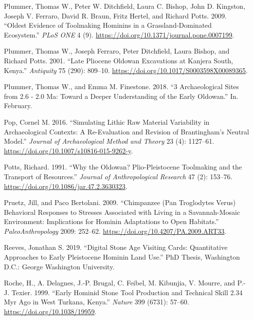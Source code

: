 \documentclass[]{elsarticle} %
\begin{document}
\leavevmode\hypertarget{ref-plummerOldestEvidenceToolmaking2009}{}%
Plummer, Thomas W., Peter W. Ditchfield, Laura C. Bishop, John D.
Kingston, Joseph V. Ferraro, David R. Braun, Fritz Hertel, and Richard
Potts. 2009. ``Oldest Evidence of Toolmaking Hominins in a
Grassland-Dominated Ecosystem.'' \emph{PLoS ONE} 4 (9).
\url{https://doi.org/10.1371/journal.pone.0007199}.

\leavevmode\hypertarget{ref-plummerLatePlioceneOldowan2001}{}%
Plummer, Thomas W., Joseph Ferraro, Peter Ditchfield, Laura Bishop, and
Richard Potts. 2001. ``Late Pliocene Oldowan Excavations at Kanjera
South, Kenya.'' \emph{Antiquity} 75 (290): 809--10.
\url{https://doi.org/10.1017/S0003598X00089365}.

\leavevmode\hypertarget{ref-plummerArchaeologicalSitesMa2018}{}%
Plummer, Thomas W., and Emma M. Finestone. 2018. ``3 Archaeological
Sites from 2.6 - 2.0 Ma: Toward a Deeper Understanding of the Early
Oldowan.'' In. February.

\leavevmode\hypertarget{ref-popSimulatingLithicRaw2016}{}%
Pop, Cornel M. 2016. ``Simulating Lithic Raw Material Variability in
Archaeological Contexts: A Re-Evaluation and Revision of Brantingham's
Neutral Model.'' \emph{Journal of Archaeological Method and Theory} 23
(4): 1127--61. \url{https://doi.org/10.1007/s10816-015-9262-y}.

\leavevmode\hypertarget{ref-pottsWhyOldowanPlioPleistocene1991}{}%
Potts, Richard. 1991. ``Why the Oldowan? Plio-Pleistocene Toolmaking and
the Transport of Resources.'' \emph{Journal of Anthropological Research}
47 (2): 153--76. \url{https://doi.org/10.1086/jar.47.2.3630323}.

\leavevmode\hypertarget{ref-pruetzChimpanzeePanTroglodytes2009}{}%
Pruetz, Jill, and Paco Bertolani. 2009. ``Chimpanzee (Pan Troglodytes
Verus) Behavioral Responses to Stresses Associated with Living in a
Savannah-Mosaic Environment: Implications for Hominin Adaptations to
Open Habitats.'' \emph{PaleoAnthropology} 2009: 252--62.
\url{https://doi.org/10.4207/PA.2009.ART33}.

\leavevmode\hypertarget{ref-reevesDigitalStoneAge2019}{}%
Reeves, Jonathan S. 2019. ``Digital Stone Age Visiting Cards:
Quantitative Approaches to Early Pleistocene Hominin Land Use.'' PhD
Thesis, Washington D.C.: George Washington University.

\leavevmode\hypertarget{ref-rocheEarlyHominidStone1999}{}%
Roche, H., A. Delagnes, J.-P. Brugal, C. Feibel, M. Kibunjia, V. Mourre,
and P.-J. Texier. 1999. ``Early Hominid Stone Tool Production and
Technical Skill 2.34 Myr Ago in West Turkana, Kenya.'' \emph{Nature} 399
(6731): 57--60. \url{https://doi.org/10.1038/19959}.
\end{document}
